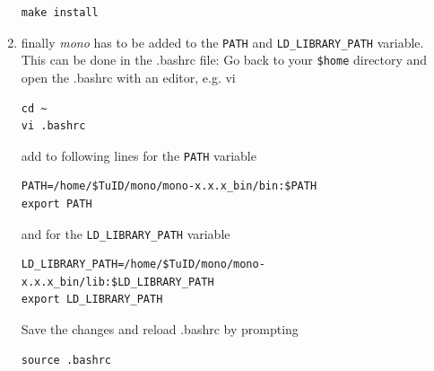 \documentclass[11pt,twoside,a4paper]{fdyartcl}
\begin{document}
\begin{enumerate}
\begin{verbatim}
make install
\end{verbatim} 
\item finally \emph{mono} has to be added to the \verb|PATH| and \verb|LD_LIBRARY_PATH| variable. This can be done in the .bashrc file: Go back to your \verb|$home| directory and open the .bashrc with an editor, e.g. vi
\begin{verbatim}
cd ~
vi .bashrc
\end{verbatim}
add to following lines for the \verb|PATH| variable
\begin{verbatim}
PATH=/home/$TuID/mono/mono-x.x.x_bin/bin:$PATH
export PATH
\end{verbatim}
and for the \verb|LD_LIBRARY_PATH| variable
\begin{verbatim}
LD_LIBRARY_PATH=/home/$TuID/mono/mono-x.x.x_bin/lib:$LD_LIBRARY_PATH
export LD_LIBRARY_PATH
\end{verbatim}
Save the changes and reload .bashrc by prompting
\begin{verbatim}
source .bashrc
\end{verbatim}
\end{enumerate} 
\end{document}
